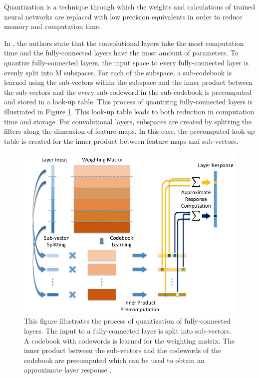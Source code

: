 Quantization is a technique through which the weights and calculations of trained neural networks are replaced with low precision equivalents in order to reduce memory and computation time.

In \cite{DBLP:journals/corr/WuLWHC15}, the authors state that the convolutional layers take the most computation time and the fully-connected layers have the most amount of parameters. To quantize fully-connected layers, the input space to every fully-connected layer is evenly split into M subspaces. For each of the subspace, a sub-codebook is learned using the sub-vectors within the subspace and the inner product between the sub-vectors and the every sub-codeword in the sub-codebook is precomputed and stored in a look-up table. This process of quantizing fully-connected layers is illustrated in Figure \ref{Fig:quantiz}. This look-up table leads to both reduction in computation time and storage. For convolutional layers, subspaces are created by splitting the filters along the dimension of feature maps. In this case, the precomputed look-up table is created for the inner product between feature maps and sub-vectors. 

	\begin{figure}[h]
		\centering
		\includegraphics[width=.7\linewidth]{images/quantization}
		\caption{This figure illustrates the process of quantization of fully-connected layers. The input to a fully-connected layer is split into sub-vectors. A codebook with codewords is learned for the weighting matrix. The inner product between the sub-vectors and the codewords of the codebook are precomputed which can be used to obtain an approximate layer response \cite{DBLP:journals/corr/WuLWHC15}.}
		\label{Fig:quantiz}
	\end{figure}



